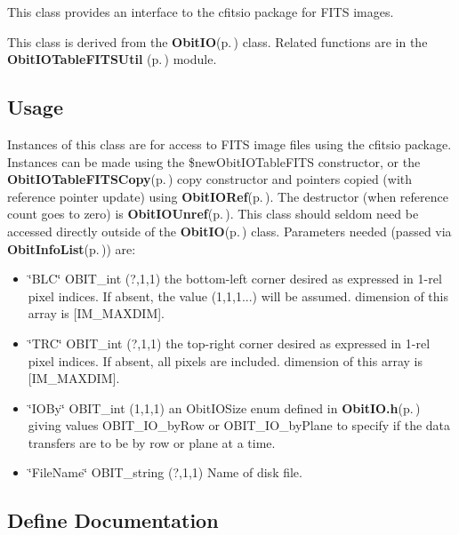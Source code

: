 This class provides an interface to the cfitsio package for FITS images.

This class is derived from the {\bf Obit\-IO}{\rm (p.\,\pageref{structObitIO})} class. Related functions are in the {\bf Obit\-IOTable\-FITSUtil }{\rm (p.\,\pageref{ObitIOTableFITSUtil_8h})} module.\subsection{Usage}\label{ObitIOTableFITS_8h_ObitIOTableFITSUsage}
Instances of this class are for access to FITS image files using the cfitsio package. Instances can be made using the \$new\-Obit\-IOTable\-FITS constructor, or the {\bf Obit\-IOTable\-FITSCopy}{\rm (p.\,\pageref{ObitIOTableFITS_8c_a17})} copy constructor and pointers copied (with reference pointer update) using {\bf Obit\-IORef}{\rm (p.\,\pageref{ObitIO_8h_a1})}. The destructor (when reference count goes to zero) is {\bf Obit\-IOUnref}{\rm (p.\,\pageref{ObitIO_8h_a0})}. This class should seldom need be accessed directly outside of the {\bf Obit\-IO}{\rm (p.\,\pageref{structObitIO})} class. Parameters needed (passed via {\bf Obit\-Info\-List}{\rm (p.\,\pageref{structObitInfoList})}) are: \begin{itemize}
\item \char`\"{}BLC\char`\"{} OBIT\_\-int (?,1,1) the bottom-left corner desired as expressed in 1-rel pixel indices. If absent, the value (1,1,1...) will be assumed. dimension of this array is [IM\_\-MAXDIM]. \item \char`\"{}TRC\char`\"{} OBIT\_\-int (?,1,1) the top-right corner desired as expressed in 1-rel pixel indices. If absent, all pixels are included. dimension of this array is [IM\_\-MAXDIM]. \item \char`\"{}IOBy\char`\"{} OBIT\_\-int (1,1,1) an Obit\-IOSize enum defined in {\bf Obit\-IO.h}{\rm (p.\,\pageref{ObitIO_8h})} giving values OBIT\_\-IO\_\-by\-Row or OBIT\_\-IO\_\-by\-Plane to specify if the data transfers are to be by row or plane at a time. \item \char`\"{}File\-Name\char`\"{} OBIT\_\-string (?,1,1) Name of disk file.\end{itemize}


\subsection{Define Documentation}

